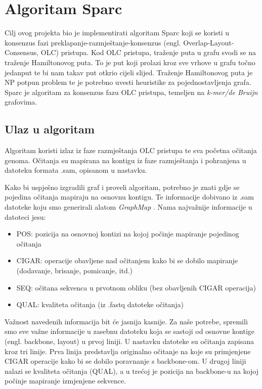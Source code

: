 \chapter{Algoritam Sparc}

Cilj ovog projekta bio je implementirati algoritam Sparc \citep{ye2016sparc} koji se koristi u konsenzus fazi preklapanje-razmještanje-konsenzus (engl. Overlap-Layout-Consensus, OLC) pristupa.
Kod OLC pristupa, traženje puta u grafu svodi se na traženje Hamiltonovog puta.
To je put koji prolazi kroz sve vrhove u grafu točno jedanput te bi nam takav put otkrio cijeli slijed.
Traženje Hamiltonovog puta je NP potpun problem te je potrebno uvesti heuristike za pojednostavljenja grafa.
Sparc je algoritam za konsenzus fazu OLC pristupa, temeljen na \emph{k-mer/de Bruijn} \citep{hannenhalli1996positional} grafovima.

\section{Ulaz u algoritam}
Algoritam koristi izlaz iz faze razmještanja OLC pristupa te sva početna očitanja genoma.
Očitanja su mapirana na kontigu iz faze razmještanja i pohranjena u datoteku formata .sam, opisanom u nastavku.

Kako bi uspješno izgradili graf i proveli algoritam, potrebno je znati gdje se pojedina očitanja mapiraju na osnovnu kontigu.
Te informacije dobivano iz .sam datoteke koju smo generirali alatom \emph{GraphMap} \citep{sovic2016fast}.
Nama najvažnije informacije u datoteci jesu:
\begin{itemize}
  \item POS: pozicija na osnovnoj kontizi na kojoj počinje mapiranje pojedinog očitanja
  \item CIGAR: operacije obavljene nad očitanjem kako bi se dobilo mapiranje (dodavanje, brisanje, pomicanje, itd.)
  \item SEQ: očitana sekvenca u prvotnom obliku (bez obavljenih CIGAR operacija)
  \item QUAL: kvaliteta očitanja (iz .fastq datoteke očitanja)
\end{itemize}

Važnost navedenih informacija bit će jasnija kasnije.
Za naše potrebe, spremili smo sve važne informacije u zasebnu datoteku koja se sastoji od osnovne kontige (engl. backbone, layout) u prvoj liniji.
U nastavku datoteke su očitanja zapisana kroz tri linije.
Prva linija predstavlja originalno očitanje na koje su primjenjene CIGAR operacije kako bi se dobilo poravnanje s backbone-om.
U drugoj liniji nalazi se kvaliteta očitanja (QUAL), a u trećoj je pozicija na backbone-u na kojoj počinje mapiranje izmjenjene sekvence.

